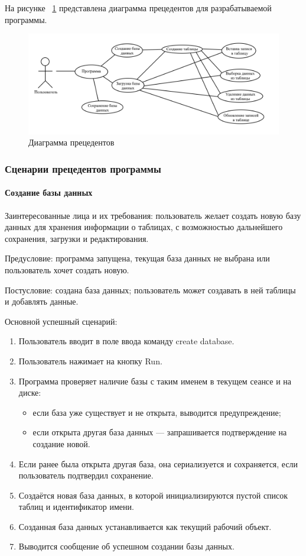 На рисунке ~\ref{fig:prec} представлена диаграмма прецедентов для разрабатываемой программы.

\begin{figure}[H]
	\centering
	\includegraphics[width=1\linewidth]{images/prec}
	\caption{Диаграмма прецедентов}
	\label{fig:prec}
\end{figure}

\subsubsection{Сценарии прецедентов программы}

\paragraph{Создание базы данных}

Заинтересованные лица и их требования: пользователь желает создать новую базу данных для хранения информации о таблицах, с возможностью дальнейшего сохранения, загрузки и редактирования.

Предусловие: программа запущена, текущая база данных не выбрана или пользователь хочет создать новую.

Постусловие: создана база данных; пользователь может создавать в ней таблицы и добавлять данные.

Основной успешный сценарий:
\begin{enumerate}
	\item Пользователь вводит в поле ввода команду create database.	
	\item Пользователь нажимает на кнопку Run.	
	\item Программа проверяет наличие базы с таким именем в текущем сеансе и на диске:
	\begin{itemize}
		\item если база уже существует и не открыта, выводится предупреждение;	
		\item если открыта другая база данных — запрашивается подтверждение на создание новой.
	\end{itemize}
	\item Если ранее была открыта другая база, она сериализуется и сохраняется, если пользователь подтвердил сохранение.	
	\item Создаётся новая база данных, в которой инициализируются пустой список таблиц и идентификатор имени.	
	\item Созданная база данных устанавливается как текущий рабочий объект.
	\item Выводится сообщение об успешном создании базы данных.	
\end{enumerate}

